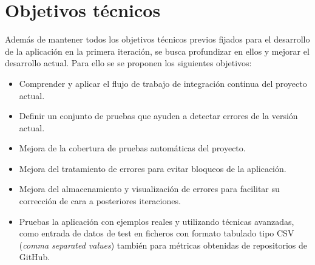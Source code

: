\section{Objetivos técnicos}
Además de mantener todos los objetivos técnicos previos fijados para el desarrollo de la aplicación en la primera iteración, se busca profundizar en ellos y mejorar el desarrollo actual. Para ello se se proponen los siguientes objetivos:
\begin{itemize}
	\tightlist
	\item Comprender y aplicar el flujo de trabajo de integración continua del proyecto actual.
	\item Definir un conjunto de pruebas que ayuden a detectar errores de la versión actual.
	\item Mejora de la cobertura de pruebas automáticas del proyecto.
	\item Mejora del tratamiento de errores para evitar bloqueos de la aplicación.
	\item Mejora del almacenamiento y visualización de errores para facilitar su corrección de cara a posteriores iteraciones.
	\item Pruebas la aplicación con ejemplos reales y utilizando técnicas avanzadas, como entrada de datos de test en ficheros con formato tabulado tipo CSV (\textit{comma separated values}) también para métricas obtenidas de repositorios de GitHub. 	
\end{itemize}


